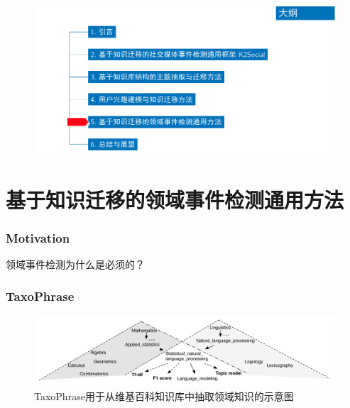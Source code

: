 \begin{withoutheadline}
\begin{frame}
\vspace*{-13mm}
\begin{figure}
	\hspace*{-4.2mm}
    \includegraphics[width=1.0\paperwidth]{img/contents5_output.pdf}
\end{figure}

\end{frame}
\end{withoutheadline}

\section{基于知识迁移的领域事件检测通用方法}
\begin{frame}
\frametitle{Motivation}
领域事件检测为什么是必须的？
\end{frame}

\begin{frame}
\frametitle{TaxoPhrase}	

\begin{figure}
	\caption{TaxoPhrase用于从维基百科知识库中抽取领域知识的示意图}
    \includegraphics[width=1.0\textwidth]{img/TD+/taxophrase_motivation.pdf}
\end{figure}
\end{frame}

